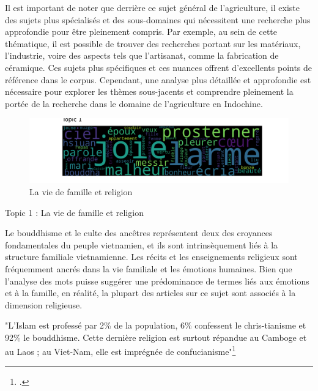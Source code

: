 
Il est important de noter que derrière ce sujet général de l'agriculture, il existe des sujets plus spécialisés et des sous-domaines qui nécessitent une recherche plus approfondie pour être pleinement compris. Par exemple, au sein de cette thématique, il est possible de trouver des recherches portant sur les matériaux, l'industrie, voire des aspects tels que l'artisanat, comme la fabrication de céramique. Ces sujets plus spécifiques et ces nuances offrent d'excellents points de référence dans le corpus. Cependant, une analyse plus détaillée et approfondie est nécessaire pour explorer les thèmes sous-jacents et comprendre pleinement la portée de la recherche dans le domaine de l'agriculture en Indochine.

\begin{figure}[H] %
    \centering
    \includegraphics[width=14cm]{img/final_6_topic 1 .png}
    \caption{La vie de famille et religion }
    \label{tp1}
\end{figure}

Topic 1 : La vie de famille et religion

Le bouddhisme et le culte des ancêtres représentent deux des croyances fondamentales du peuple vietnamien, et ils sont intrinsèquement liés à la structure familiale vietnamienne. Les récits et les enseignements religieux sont fréquemment ancrés dans la vie familiale et les émotions humaines. Bien que l'analyse des mots puisse suggérer une prédominance de termes liés aux émotions et à la famille, en réalité, la plupart des articles sur ce sujet sont associés à la dimension religieuse.

"L’Islam est professé par 2\% de la population, 6\% confessent le chris-tianisme et 92\% le bouddhisme. Cette dernière religion est surtout répandue au Camboge et au Laos ; au Viet-Nam, elle est imprégnée de confucianisme"\footcites{truong}


